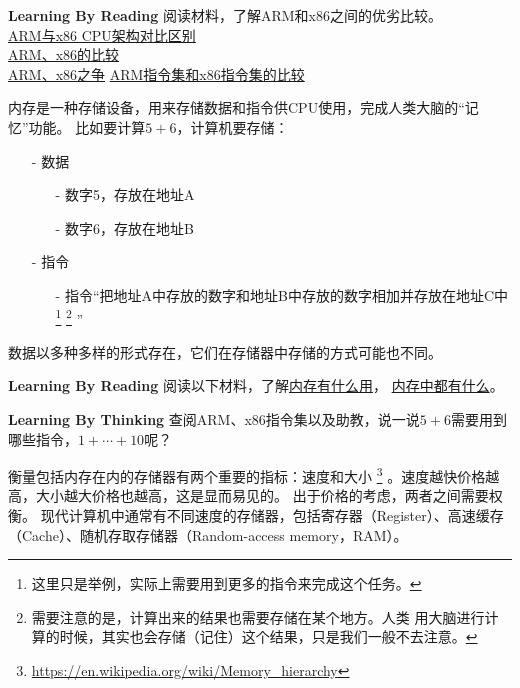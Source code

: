 \begin{paperbox}{\textbf{Learning By Reading}\startwo}
阅读材料，了解ARM和x86之间的优劣比较。\\
\href{http://ihyperwin.iteye.com/blog/1701132}{ARM与x86 CPU架构对比区别}\\
\href{https://www.zhihu.com/question/19846434}{ARM、x86的比较}\\
\href{https://hellolynn.hpd.io/2017/04/14/看arm如何搶走x86市場？英特爾被逆襲下的策略/}{ARM、x86之争}
\href{http://www.cnblogs.com/croot/archive/2012/11/24/3235140.html}{ARM指令集和x86指令集的比较}
\end{paperbox}
内存是一种存储设备，用来存储数据和指令供CPU使用，完成人类大脑的“记忆”功能。
比如要计算$5+6$，计算机要存储：\\
\begin{itemize}
\item[-]数据
\begin{itemize}
\item[-]数字5，存放在地址A
\item[-]数字6，存放在地址B
\end{itemize}
\item[-]指令
\begin{itemize}
\item[-]指令“把地址A中存放的数字和地址B中存放的数字相加并存放在地址C中
\footnote{这里只是举例，实际上需要用到更多的指令来完成这个任务。}
\footnote{需要注意的是，计算出来的结果也需要存储在某个地方。人类
用大脑进行计算的时候，其实也会存储（记住）这个结果，只是我们一般不去注意。}
”
\end{itemize}
\end{itemize}
数据以多种多样的形式存在，它们在存储器中存储的方式可能也不同。
\begin{paperbox}{\textbf{Learning By Reading}\starone}
阅读以下材料，了解\href{https://www.crucial.cn/support/faq/the-role-of-memory-in-the-computer}{内存有什么用}，
\href{http://www.cppblog.com/prayer/archive/2009/08/17/93594.html}{内存中都有什么}。
\end{paperbox}
\begin{paperbox}{\textbf{Learning By Thinking}\startwo}
查阅ARM、x86指令集以及助教，说一说$5+6$需要用到哪些指令，$1+\cdots+10$呢？
\end{paperbox}
衡量包括内存在内的存储器有两个重要的指标：速度和大小
\footnote{\url{https://en.wikipedia.org/wiki/Memory_hierarchy}}
。速度越快价格越高，大小越大价格也越高，这是显而易见的。
出于价格的考虑，两者之间需要权衡。
现代计算机中通常有不同速度的存储器，包括寄存器（Register）、高速缓存（Cache）、随机存取存储器（Random-access memory，RAM）。
